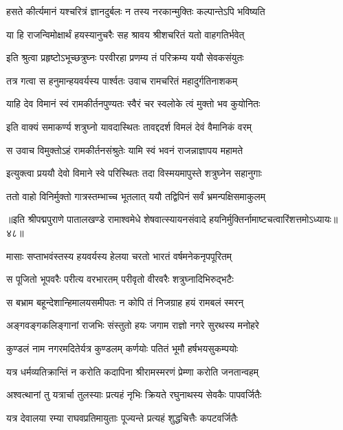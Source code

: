 \twolineshloka
{हसते कीर्त्यमानं यश्चरित्रं ज्ञानदुर्बलः}
{न तस्य नरकान्मुक्तिः कल्पान्तेऽपि भविष्यति}%

\twolineshloka
{या हि राजन्विमोक्षार्थं हयस्यानुचरैः सह}
{श्रावय श्रीशचरितं यतो वाहगतिर्भवेत्}%


\twolineshloka
{इति श्रुत्वा प्रहृष्टोऽभूच्छत्रुघ्नः परवीरहा}
{प्रणम्य तं परिक्रम्य ययौ सेवकसंयुतः}%

\twolineshloka
{तत्र गत्वा स हनुमान्हयवर्यस्य पार्श्वतः}
{उवाच रामचरितं महादुर्गतिनाशकम्}%

\twolineshloka
{याहि देव विमानं स्वं रामकीर्तनपुण्यतः}
{स्वैरं चर स्वलोके त्वं मुक्तो भव कुयोनितः}%

\twolineshloka
{इति वाक्यं समाकर्ण्य शत्रुघ्नो यावदास्थितः}
{तावद्ददर्श विमलं देवं वैमानिकं वरम्}%

\twolineshloka
{स उवाच विमुक्तोऽहं रामकीर्तनसंश्रुतेः}
{यामि स्वं भवनं राजन्नाज्ञापय महामते}%

\twolineshloka
{इत्युक्त्वा प्रययौ देवो विमाने स्वे परिस्थितः}
{तदा विस्मयमापुस्ते शत्रुघ्नेन सहानुगाः}%

\twolineshloka
{ततो वाहो विनिर्मुक्तो गात्रस्तम्भाच्च भूतलात्}
{ययौ तद्विपिनं सर्वं भ्रमन्पक्षिसमाकुलम्}%

{॥इति श्रीपद्मपुराणे पातालखण्डे रामाश्वमेधे शेषवात्स्यायनसंवादे हयनिर्मुक्तिर्नामाष्टचत्वारिंशत्तमोऽध्यायः॥४८॥}



\twolineshloka
{मासाः सप्ताभवंस्तस्य हयवर्यस्य हेलया}
{चरतो भारतं वर्षमनेकनृपपूरितम्}%

\twolineshloka
{स पूजितो भूपवरैः परीत्य वरभारतम्}
{परीवृतो वीरवरैः शत्रुघ्नादिभिरुद्भटैः}%

\twolineshloka
{स बभ्राम बहून्देशान्हिमालयसमीपतः}
{न कोपि तं निजग्राह हयं रामबलं स्मरन्}%

\twolineshloka
{अङ्गवङ्गकलिङ्गानां राजभिः संस्तुतो हयः}
{जगाम राज्ञो नगरे सुरथस्य मनोहरे}%

\twolineshloka
{कुण्डलं नाम नगरमदितेर्यत्र कुण्डलम्}
{कर्णयोः पतितं भूमौ हर्षभयसुकम्पयोः}%

\twolineshloka
{यत्र धर्मव्यतिक्रान्तिं न करोति कदापिना}
{श्रीरामस्मरणं प्रेम्णा करोति जनतान्वहम्}%

\twolineshloka
{अश्वत्थानां तु यत्रार्चा तुलस्याः प्रत्यहं नृभिः}
{क्रियते रघुनाथस्य सेवकैः पापवर्जितैः}%

\twolineshloka
{यत्र देवालया रम्या राघवप्रतिमायुताः}
{पूज्यन्ते प्रत्यहं शुद्धचित्तैः कपटवर्जितैः}%


